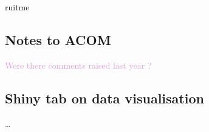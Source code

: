 ruitme\documentclass[pdftex,11pt,a4paper]{report}
\begin{document}
 

 \subsection{Notes to ACOM}
 
 \textcolor{Plum}{Were there comments raised last year ?}

 \subsection{Shiny tab on data visualisation}
 
 \dots{}
\end{document}
